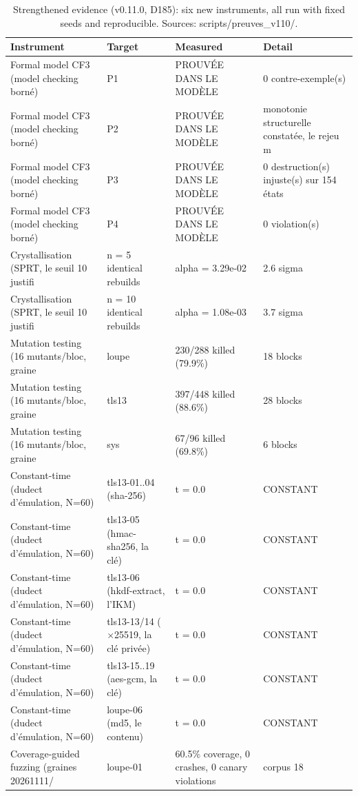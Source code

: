 \begin{table}[htbp]\centering\footnotesize
\caption{Strengthened evidence (v0.11.0, D185): six new instruments, all run with fixed seeds and reproducible. Sources: scripts/preuves\_v110/.}
\label{tab:preuves110}
\begin{tabularx}{\textwidth}{@{}l l X l@{}}
\toprule
\textbf{Instrument} & \textbf{Target} & \textbf{Measured} & \textbf{Detail} \\
\midrule
Formal model CF3 (model checking borné) & P1 & PROUVÉE DANS LE MODÈLE & 0 contre-exemple(s) \\
Formal model CF3 (model checking borné) & P2 & PROUVÉE DANS LE MODÈLE & monotonie structurelle constatée, le rejeu m \\
Formal model CF3 (model checking borné) & P3 & PROUVÉE DANS LE MODÈLE & 0 destruction(s) injuste(s) sur 154 états \\
Formal model CF3 (model checking borné) & P4 & PROUVÉE DANS LE MODÈLE & 0 violation(s) \\
Crystallisation (SPRT, le seuil 10 justifi & n = 5 identical rebuilds & alpha = 3.29e-02 & 2.6 sigma \\
Crystallisation (SPRT, le seuil 10 justifi & n = 10 identical rebuilds & alpha = 1.08e-03 & 3.7 sigma \\
Mutation testing (16 mutants/bloc, graine  & loupe & 230/288 killed (79.9\%) & 18 blocks \\
Mutation testing (16 mutants/bloc, graine  & tls13 & 397/448 killed (88.6\%) & 28 blocks \\
Mutation testing (16 mutants/bloc, graine  & sys & 67/96 killed (69.8\%) & 6 blocks \\
Constant-time (dudect d'émulation, N=60) & tls13-01..04 (sha-256) & t = 0.0 & CONSTANT \\
Constant-time (dudect d'émulation, N=60) & tls13-05 (hmac-sha256, la clé) & t = 0.0 & CONSTANT \\
Constant-time (dudect d'émulation, N=60) & tls13-06 (hkdf-extract, l'IKM) & t = 0.0 & CONSTANT \\
Constant-time (dudect d'émulation, N=60) & tls13-13/14 ($\times$25519, la clé privée) & t = 0.0 & CONSTANT \\
Constant-time (dudect d'émulation, N=60) & tls13-15..19 (aes-gcm, la clé) & t = 0.0 & CONSTANT \\
Constant-time (dudect d'émulation, N=60) & loupe-06 (md5, le contenu) & t = 0.0 & CONSTANT \\
Coverage-guided fuzzing (graines 20261111/ & loupe-01 & 60.5\% coverage, 0 crashes, 0 canary violations & corpus 18 \\

\end{tabularx}
\end{table}
